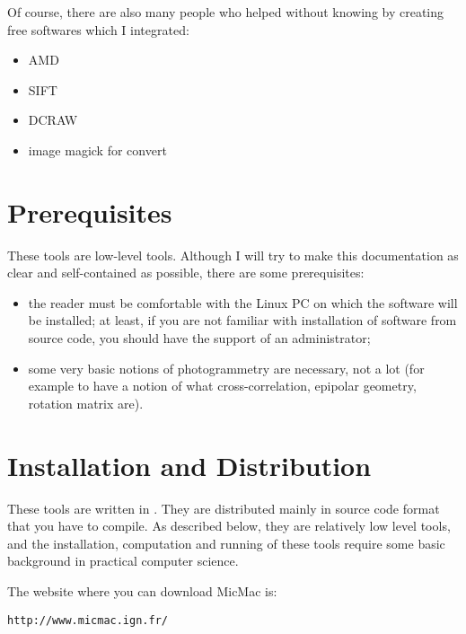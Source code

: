 Of course, there are also many people who helped without knowing by creating
free softwares which I integrated:


\begin{itemize}
   \item    AMD
   \item    SIFT
   \item    DCRAW
   \item    image magick for convert
\end{itemize}


\section{Prerequisites}

These tools are low-level tools. Although I will try to make this
documentation as clear and self-contained as possible, there are some
prerequisites:

\begin{itemize}
   \item the reader must be comfortable with the Linux PC on which the software
         will be installed; at least, if you are not familiar with installation
         of software from source code, you should have the support of 
         an administrator;

   \item some very basic notions of photogrammetry are necessary, not a lot
         (for example to have a notion of what cross-correlation,
         epipolar geometry, rotation matrix are).
\end{itemize}


\section{Installation and Distribution}

\label{Install}
These tools are written in \CPP. They are distributed mainly in source code
format that you have to compile. As described below, they are relatively
low level tools, and the installation, computation and running of these
tools require some basic background in practical computer science.

The website where you can download MicMac is:

\begin{verbatim}
http://www.micmac.ign.fr/
\end{verbatim}

